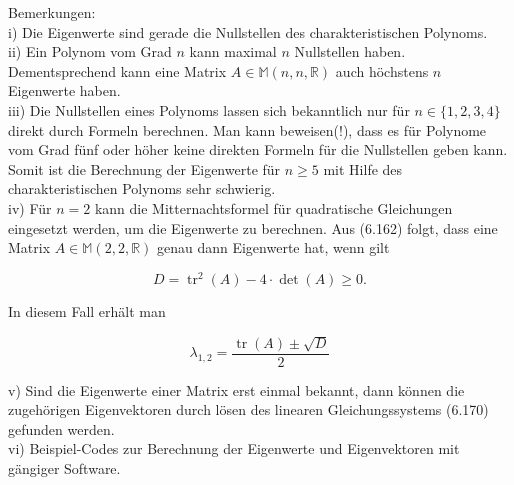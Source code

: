 \documentclass[10pt]{article}
\begin{document}
Bemerkungen:\\
i) Die Eigenwerte sind gerade die Nullstellen des charakteristischen Polynoms.\\
ii) Ein Polynom vom Grad $n$ kann maximal $n$ Nullstellen haben. Dementsprechend kann eine Matrix $A \in \mathbb{M}(n, n, \mathbb{R})$ auch höchstens $n$ Eigenwerte haben.\\
iii) Die Nullstellen eines Polynoms lassen sich bekanntlich nur für $n \in\{1,2,3,4\}$ direkt durch Formeln berechnen. Man kann beweisen(!), dass es für Polynome vom Grad fünf oder höher keine direkten Formeln für die Nullstellen geben kann. Somit ist die Berechnung der Eigenwerte für $n \geq 5$ mit Hilfe des charakteristischen Polynoms sehr schwierig.\\
iv) Für $n=2$ kann die Mitternachtsformel für quadratische Gleichungen eingesetzt werden, um die Eigenwerte zu berechnen. Aus (6.162) folgt, dass eine Matrix $A \in \mathbb{M}(2,2, \mathbb{R})$ genau dann Eigenwerte hat, wenn gilt


\begin{equation*}
D=\operatorname{tr}^{2}(A)-4 \cdot \operatorname{det}(A) \geq 0 . \tag{6.172}
\end{equation*}


In diesem Fall erhält man


\begin{equation*}
\lambda_{1,2}=\frac{\operatorname{tr}(A) \pm \sqrt{D}}{2} \tag{6.173}
\end{equation*}


v) Sind die Eigenwerte einer Matrix erst einmal bekannt, dann können die zugehörigen Eigenvektoren durch lösen des linearen Gleichungssystems (6.170) gefunden werden.\\
vi) Beispiel-Codes zur Berechnung der Eigenwerte und Eigenvektoren mit gängiger Software.
\end{document}
